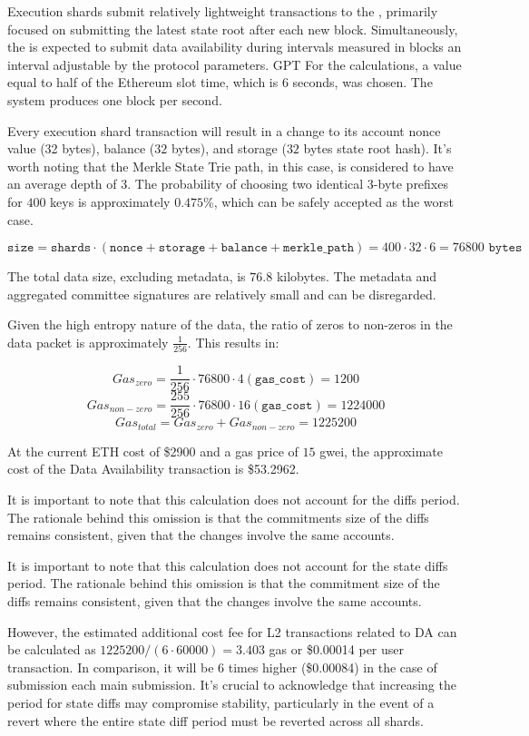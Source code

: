 Execution shards submit relatively lightweight transactions to the \mainshard, primarily focused 
on submitting the latest state root after each new block. 
Simultaneously, the \mainshard is expected 
to submit data availability during intervals measured in blocks an interval adjustable by the protocol parameters. 
GPT
For the calculations, a value equal to half of the Ethereum slot time, which is 6 seconds, was chosen.
The system produces one block per second.

Every execution shard transaction will result in a change to its account nonce value (32 bytes), 
balance ($32$ bytes), and storage ($32$ bytes state root hash). 
It's worth noting that the Merkle State 
Trie path, in this case, is considered to have an average depth of 3. 
The probability of choosing two 
identical 3-byte prefixes for $400$ keys is approximately $0.475$\%, which can be safely accepted as 
the worst case.

\[
\texttt{size} = \texttt{shards} \cdot (\texttt{nonce} + \texttt{storage} + \texttt{balance} + \texttt{merkle\_path}) = 400 \cdot 32 \cdot 6 = 76800 \texttt{ bytes}
\]


The total data size, excluding metadata, is $76.8$ kilobytes. The metadata and aggregated committee 
signatures are relatively small and can be disregarded.

Given the high entropy nature of the data, the ratio of zeros to non-zeros in the data packet is 
approximately $\frac{1}{256}$. This results in:

\[
    Gas_{zero} = \frac{1}{256} \cdot 76800 \cdot 4(\texttt{gas\_cost}) = 1200
\]
\[
    Gas_{non-zero} = \frac{255}{256} \cdot 76800 \cdot 16(\texttt{gas\_cost}) = 1224000
\]
\[
    Gas_{total} = Gas_{zero} + Gas_{non-zero} = 1225200
\]


At the current ETH cost of \$2900 and a gas price of $15$ gwei, the approximate cost of the Data 
Availability transaction is \$53.2962.

It is important to note that this calculation does not account for the diffs period. The rationale 
behind this omission is that the commitments size of the diffs remains consistent, given that the 
changes involve the same accounts.

It is important to note that this calculation does not account for the state diffs period. 
The rationale behind this omission is that the commitment size of the diffs remains consistent, 
given that the changes involve the same accounts.

However, the estimated additional cost fee for L2 transactions related to DA can be calculated as 
$1225200 / (6 \cdot 60000) = 3.403$ gas or \$0.00014 per user transaction. In comparison, it will be 6 
times higher (\$0.00084) in the case of submission each main submission. It's crucial to acknowledge 
that increasing the period for state diffs may compromise stability, particularly in the event of a 
\mainshard revert where the entire state diff period must be reverted across all shards.



